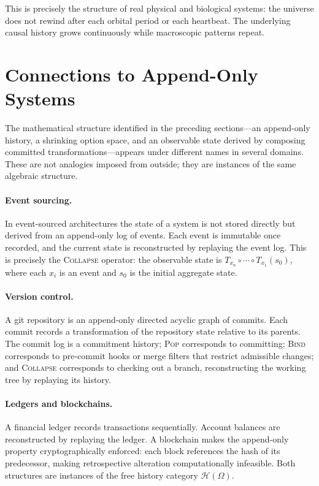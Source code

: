 \documentclass[12pt]{article}
\begin{document}
This is precisely the structure of real physical and biological systems: the universe does not rewind after each orbital period or each heartbeat. The underlying causal history grows continuously while macroscopic patterns repeat.

\section{Connections to Append-Only Systems}
\label{sec:connections}

The mathematical structure identified in the preceding sections---an append-only history, a shrinking option space, and an observable state derived by composing committed transformations---appears under different names in several domains. These are not analogies imposed from outside; they are instances of the same algebraic structure.

\paragraph{Event sourcing.} In event-sourced architectures the state of a system is not stored directly but derived from an append-only log of events. Each event is immutable once recorded, and the current state is reconstructed by replaying the event log. This is precisely the \textsc{Collapse} operator: the observable state is $T_{x_n} \circ \cdots \circ T_{x_1}(s_0)$, where each $x_i$ is an event and $s_0$ is the initial aggregate state.

\paragraph{Version control.} A git repository is an append-only directed acyclic graph of commits. Each commit records a transformation of the repository state relative to its parents. The commit log is a commitment history; \textsc{Pop} corresponds to committing; \textsc{Bind} corresponds to pre-commit hooks or merge filters that restrict admissible changes; and \textsc{Collapse} corresponds to checking out a branch, reconstructing the working tree by replaying its history.

\paragraph{Ledgers and blockchains.} A financial ledger records transactions sequentially. Account balances are reconstructed by replaying the ledger. A blockchain makes the append-only property cryptographically enforced: each block references the hash of its predecessor, making retrospective alteration computationally infeasible. Both structures are instances of the free history category $\mathcal{H}(\Omega)$.
\end{document}
